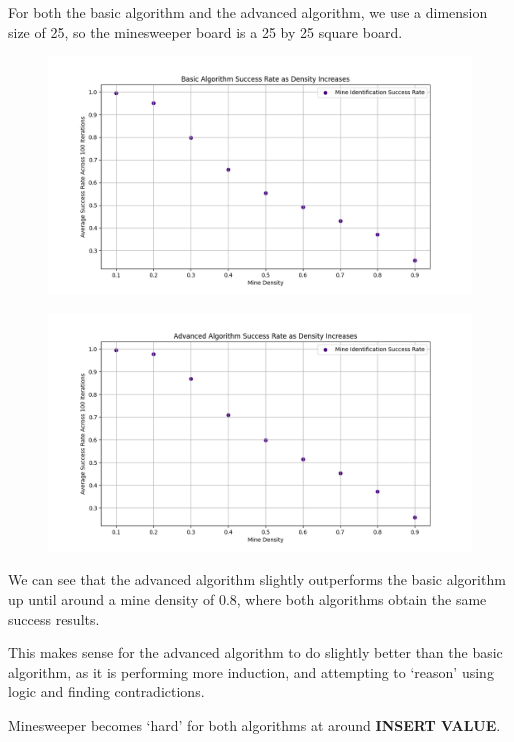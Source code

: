 \documentclass[12pt, twoside]{article}
\begin{document}
\begin{enumerate}[itemsep=2mm,parsep=4mm]
        For both the basic algorithm and the advanced algorithm, we use a dimension size of 25, so the minesweeper board is a 25 by 25 square board.

        \begin{figure}[H]
            \centering
            \includegraphics[scale = 0.5]{Basic Algorithm.png}
        \end{figure}
        \begin{figure}[H]
            \centering
            \includegraphics[scale = 0.5]{Advanced Algorithm.png}
        \end{figure}

        We can see that the advanced algorithm slightly outperforms the basic algorithm up until around a mine density of 0.8, where both algorithms obtain the same success results.

        This makes sense for the advanced algorithm to do slightly better than the basic algorithm, as it is performing more induction, and attempting to `reason' using logic and finding contradictions.

        Minesweeper becomes `hard' for both algorithms at around \textbf{INSERT VALUE}.


\end{enumerate}
\end{document}
